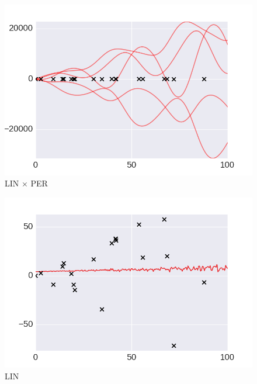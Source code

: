     \begin{subfigure}[b]{0.3\textwidth}
        \includegraphics[width=\textwidth]{figs/composition/composition_demo_LINxPER_prior.png}
        \caption{LIN $\times$ PER}

    \end{subfigure}   \begin{subfigure}[b]{0.3\textwidth}
        \includegraphics[width=\textwidth]{figs/composition/composition_demo_LIN.png}
        \caption{LIN}
    \end{subfigure}
    ~ %
